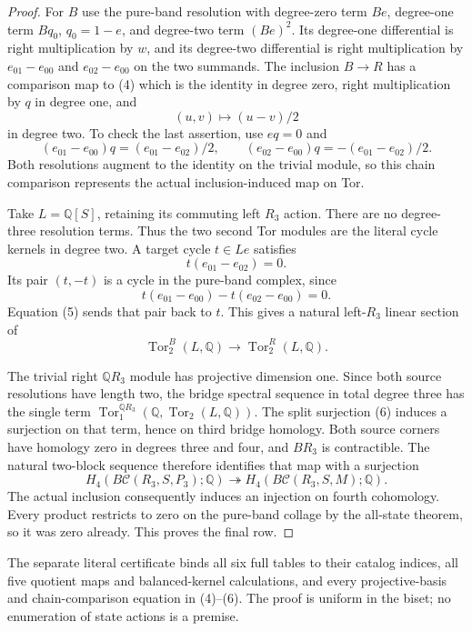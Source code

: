 \begin{proof}
For $B$ use the pure-band resolution with degree-zero
term $Be$, degree-one term $Bq_0$, $q_0=1-e$, and
degree-two term $(Be)^2$.  Its degree-one differential
is right multiplication by $w$, and its degree-two
differential is right multiplication by
$e_{01}-e_{00}$ and $e_{02}-e_{00}$ on the two summands.
The inclusion $B\to R$ has a comparison map to (4)
which is the identity in degree zero, right multiplication
by $q$ in degree one, and
\[
 (u,v)\longmapsto (u-v)/2                                   \tag{5}
\]
in degree two.  To check the last assertion, use
$eq=0$ and
\[
 (e_{01}-e_{00})q=(e_{01}-e_{02})/2,\qquad
 (e_{02}-e_{00})q=-(e_{01}-e_{02})/2.
\]
Both resolutions augment to the identity on the
trivial module, so this chain comparison represents
the actual inclusion-induced map on Tor.

Take $L=\mathbb Q[S]$, retaining its commuting left
$R_3$ action.  There are no degree-three resolution
terms.  Thus the two second Tor modules are the
literal cycle kernels in degree two.  A target cycle
$t\in Le$ satisfies
\[
 t(e_{01}-e_{02})=0.
\]
Its pair $(t,-t)$ is a cycle in the pure-band complex,
since
\[
 t(e_{01}-e_{00})-t(e_{02}-e_{00})=0.
\]
Equation (5) sends that pair back to $t$.
This gives a natural left-$R_3$ linear section of
\[
 \operatorname{Tor}^{B}_2(L,\mathbb Q)
       \longrightarrow\operatorname{Tor}^{R}_2(L,\mathbb Q).
                                                               \tag{6}
\]

The trivial right $\mathbb QR_3$ module has projective
dimension one.  Since both source resolutions have
length two, the bridge spectral sequence in total
degree three has the single term
$\operatorname{Tor}^{\mathbb QR_3}_1
 (\mathbb Q,\operatorname{Tor}_2(L,\mathbb Q))$.
The split surjection (6) induces a surjection on
that term, hence on third bridge homology.
Both source corners have homology zero in degrees
three and four, and $BR_3$ is contractible.
The natural two-block sequence therefore identifies
that map with a surjection
\[
 H_4(B\mathcal C(R_3,S,P_3);\mathbb Q)
       \twoheadrightarrow
 H_4(B\mathcal C(R_3,S,M);\mathbb Q).
\]
The actual inclusion consequently induces an injection
on fourth cohomology.  Every product restricts to zero
on the pure-band collage by the all-state theorem,
so it was zero already.  This proves the final row.
\end{proof}

\begin{remark*}
The separate literal certificate binds all six full
tables to their catalog indices, all five quotient
maps and balanced-kernel calculations, and every
projective-basis and chain-comparison equation in
(4)--(6).  The proof is uniform in the biset; no
enumeration of state actions is a premise.
\end{remark*}
